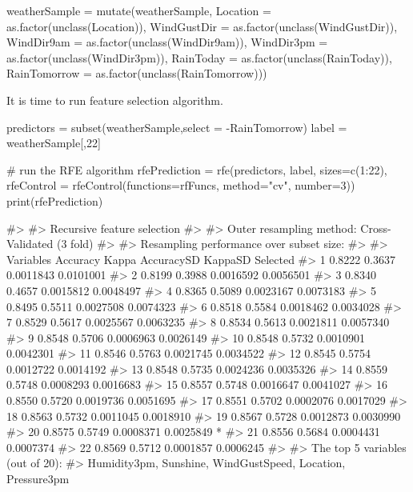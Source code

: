 \begin{Schunk}
\begin{Sinput}
weatherSample = mutate(weatherSample, Location = as.factor(unclass(Location)), 
          WindGustDir = as.factor(unclass(WindGustDir)),
          WindDir9am = as.factor(unclass(WindDir9am)), WindDir3pm = as.factor(unclass(WindDir3pm)),
          RainToday = as.factor(unclass(RainToday)), RainTomorrow = as.factor(unclass(RainTomorrow)))
\end{Sinput}
\end{Schunk}

It is time to run feature selection algorithm.

\begin{Schunk}
\begin{Sinput}
predictors = subset(weatherSample,select = -RainTomorrow)
label = weatherSample[,22]

# run the RFE algorithm
rfePrediction = rfe(predictors, label, sizes=c(1:22), 
                    rfeControl = rfeControl(functions=rfFuncs, method="cv", number=3))
print(rfePrediction)
\end{Sinput}
\begin{Soutput}
#> 
#> Recursive feature selection
#> 
#> Outer resampling method: Cross-Validated (3 fold) 
#> 
#> Resampling performance over subset size:
#> 
#>  Variables Accuracy  Kappa AccuracySD   KappaSD Selected
#>          1   0.8222 0.3637  0.0011843 0.0101001         
#>          2   0.8199 0.3988  0.0016592 0.0056501         
#>          3   0.8340 0.4657  0.0015812 0.0048497         
#>          4   0.8365 0.5089  0.0023167 0.0073183         
#>          5   0.8495 0.5511  0.0027508 0.0074323         
#>          6   0.8518 0.5584  0.0018462 0.0034028         
#>          7   0.8529 0.5617  0.0025567 0.0063235         
#>          8   0.8534 0.5613  0.0021811 0.0057340         
#>          9   0.8548 0.5706  0.0006963 0.0026149         
#>         10   0.8548 0.5732  0.0010901 0.0042301         
#>         11   0.8546 0.5763  0.0021745 0.0034522         
#>         12   0.8545 0.5754  0.0012722 0.0014192         
#>         13   0.8548 0.5735  0.0024236 0.0035326         
#>         14   0.8559 0.5748  0.0008293 0.0016683         
#>         15   0.8557 0.5748  0.0016647 0.0041027         
#>         16   0.8550 0.5720  0.0019736 0.0051695         
#>         17   0.8551 0.5702  0.0002076 0.0017029         
#>         18   0.8563 0.5732  0.0011045 0.0018910         
#>         19   0.8567 0.5728  0.0012873 0.0030990         
#>         20   0.8575 0.5749  0.0008371 0.0025849        *
#>         21   0.8556 0.5684  0.0004431 0.0007374         
#>         22   0.8569 0.5712  0.0001857 0.0006245         
#> 
#> The top 5 variables (out of 20):
#>    Humidity3pm, Sunshine, WindGustSpeed, Location, Pressure3pm
\end{Soutput}
\end{Schunk}

